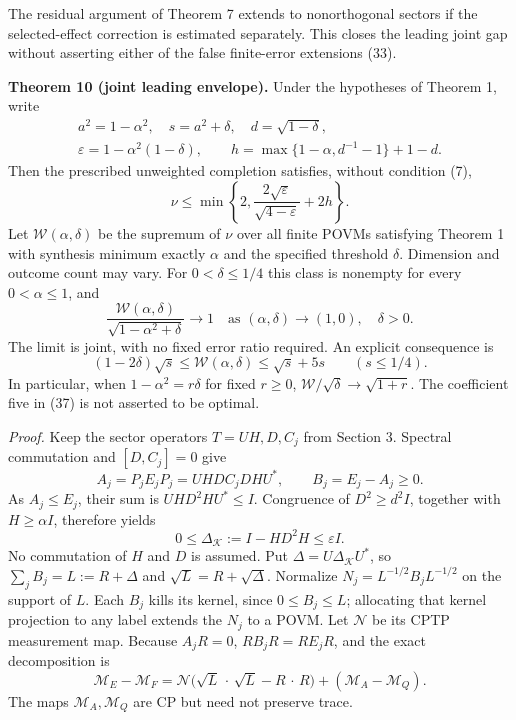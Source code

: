 \documentclass[
  11pt,
  a4paper,
]{article}
\begin{document}
The residual argument of Theorem 7 extends to nonorthogonal sectors if
the selected-effect correction is estimated separately. This closes the
leading joint gap without asserting either of the false finite-error
extensions (33).

\textbf{Theorem 10 (joint leading envelope).} Under the hypotheses of
Theorem 1, write \[\begin{gathered}
a^2=1-\alpha^2,\quad s=a^2+\delta,\quad d=\sqrt{1-\delta},\\
\varepsilon=1-\alpha^2(1-\delta),\qquad
h=\max\{1-\alpha,d^{-1}-1\}+1-d.
\end{gathered}
\tag{34}\] Then the prescribed unweighted completion satisfies, without
condition (7),
\[\nu\le\min\left\{2,\frac{2\sqrt\varepsilon}{\sqrt{4-\varepsilon}}+2h\right\}.
\tag{35}\] Let \(\mathcal W(\alpha,\delta)\) be the supremum of \(\nu\)
over all finite POVMs satisfying Theorem 1 with synthesis minimum
exactly \(\alpha\) and the specified threshold \(\delta\). Dimension and
outcome count may vary. For \(0<\delta\le1/4\) this class is nonempty
for every \(0<\alpha\le1\), and
\[\boxed{\frac{\mathcal W(\alpha,\delta)}{\sqrt{1-\alpha^2+\delta}}
\longrightarrow1\quad\text{as }(\alpha,\delta)\longrightarrow(1,0),\quad\delta>0.}
\tag{36}\] The limit is joint, with no fixed error ratio required. An
explicit consequence is
\[(1-2\delta)\sqrt{s}\le\mathcal W(\alpha,\delta)
\le\sqrt{s}+5s\qquad(s\le1/4).
\tag{37}\] In particular, when \(1-\alpha^2=r\delta\) for fixed
\(r\ge0\), \(\mathcal W/\sqrt\delta\to\sqrt{1+r}\). The coefficient five
in (37) is not asserted to be optimal.

\emph{Proof.} Keep the sector operators \(T=UH,D,C_j\) from Section 3.
Spectral commutation and \([D,C_j]=0\) give
\[A_j=P_jE_jP_j=UHDC_jDHU^*,\qquad B_j=E_j-A_j\ge0.\] As \(A_j\le E_j\),
their sum is \(UHD^2HU^*\le I\). Congruence of \(D^2\ge d^2I\), together
with \(H\ge\alpha I\), therefore yields
\[0\le\Delta_{\mathcal K}:=I-HD^2H\le\varepsilon I.\] No commutation of
\(H\) and \(D\) is assumed. Put \(\Delta=U\Delta_{\mathcal K}U^*\), so
\(\sum_jB_j=L:=R+\Delta\) and \(\sqrt L=R+\sqrt\Delta\). Normalize
\(N_j=L^{-1/2}B_jL^{-1/2}\) on the support of \(L\). Each \(B_j\) kills
its kernel, since \(0\le B_j\le L\); allocating that kernel projection
to any label extends the \(N_j\) to a POVM. Let \(\mathcal N\) be its
CPTP measurement map. Because \(A_jR=0\), \(RB_jR=RE_jR\), and the exact
decomposition is \[\mathcal M_E-\mathcal M_F
=\mathcal N\bigl(\sqrt L\,\cdot\,\sqrt L-R\,\cdot\,R\bigr)
 +(\mathcal M_A-\mathcal M_Q).
\tag{38}\] The maps \(\mathcal M_A,\mathcal M_Q\) are CP but need not
preserve trace.
\end{document}
